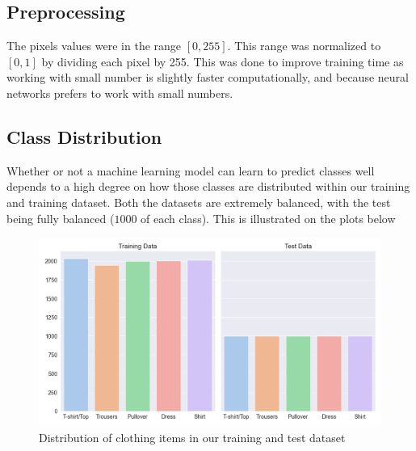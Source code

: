 \subsection{Preprocessing}
The pixels values were in the range $[0, 255]$.
This range was normalized to $[0, 1]$ by dividing each pixel by 255.
This was done to improve training time as working with small number is slightly faster computationally, and because neural networks prefers to work with small numbers.



\subsection{Class Distribution}
Whether or not a machine learning model can learn to predict classes well depends to a high degree on how those classes are distributed within our training and training dataset.
Both the datasets are extremely balanced, with the test being fully balanced ($1000$ of each class).
This is illustrated on the plots below

\begin{figure}[ht]
\centering
\includegraphics[scale=0.45]{figures_for_report/class_distribution}
\captionsetup{justification=centering,margin=2cm}
\caption{Distribution of clothing items in our training and test dataset}
\end{figure}

